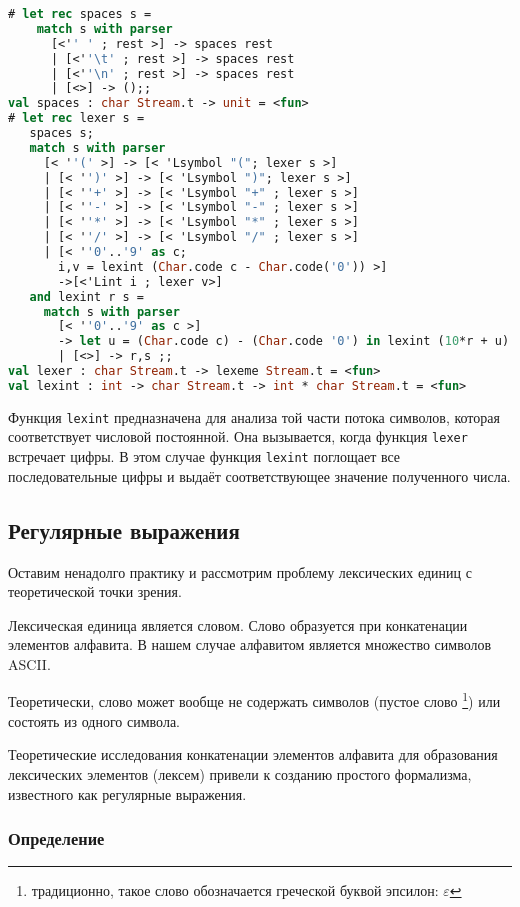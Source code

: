 \begin{lstlisting}[language=OCaml]
# let rec spaces s =
    match s with parser
      [<'' ' ; rest >] -> spaces rest
      | [<''\t' ; rest >] -> spaces rest
      | [<''\n' ; rest >] -> spaces rest
      | [<>] -> ();;
val spaces : char Stream.t -> unit = <fun>
# let rec lexer s =
   spaces s;
   match s with parser
     [< ''(' >] -> [< 'Lsymbol "("; lexer s >]
     | [< '')' >] -> [< 'Lsymbol ")"; lexer s >]
     | [< ''+' >] -> [< 'Lsymbol "+" ; lexer s >]
     | [< ''-' >] -> [< 'Lsymbol "-" ; lexer s >]
     | [< ''*' >] -> [< 'Lsymbol "*" ; lexer s >]
     | [< ''/' >] -> [< 'Lsymbol "/" ; lexer s >]
     | [< ''0'..'9' as c;
       i,v = lexint (Char.code c - Char.code('0')) >]
       ->[<'Lint i ; lexer v>]
   and lexint r s =
     match s with parser
       [< ''0'..'9' as c >]
       -> let u = (Char.code c) - (Char.code '0') in lexint (10*r + u) s
       | [<>] -> r,s ;;
val lexer : char Stream.t -> lexeme Stream.t = <fun>
val lexint : int -> char Stream.t -> int * char Stream.t = <fun>
\end{lstlisting}

Функция \texttt{lexint} предназначена для анализа той части потока символов,
которая соответствует числовой постоянной. Она вызывается, когда функция
\texttt{lexer} встречает цифры. В этом случае функция \texttt{lexint} поглощает
все последовательные цифры и выдаёт соответствующее значение полученного числа.

\subsection{Регулярные выражения}

Оставим ненадолго практику и рассмотрим проблему лексических единиц с
теоретической точки зрения.

Лексическая единица является словом. Слово образуется при конкатенации элементов
алфавита. В нашем случае алфавитом является множество символов ASCII.

Теоретически, слово может вообще не содержать символов (пустое слово
\footnote{традиционно, такое слово обозначается греческой буквой эпсилон:
$\varepsilon$}) или состоять из одного символа.

Теоретические исследования конкатенации элементов алфавита для образования
лексических элементов (лексем) привели к созданию простого формализма,
известного как регулярные выражения.

\subsubsection{Определение}

